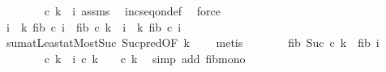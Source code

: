 \begin{isabellebody}
\ \ \ \ \ \ \isamarkupfalse%
\ {\isacartoucheopen}c\ k\ {\isacharless}{\kern0pt}\ i{\isacartoucheclose}\ assms\ \isamarkupfalse%
\ inc{\isacharunderscore}{\kern0pt}seq{\isacharunderscore}{\kern0pt}on{\isacharunderscore}{\kern0pt}def\ \isamarkupfalse%
\ force{\isacharplus}{\kern0pt}\isanewline
\ \ \ \ \isamarkupfalse%
\ {\isachardoublequoteopen}{\isacharparenleft}{\kern0pt}{\isasymSum}i\ {\isacharequal}{\kern0pt}\ {}{\isachardot}{\kern0pt}{\isachardot}{\kern0pt}k{\isacharminus}{\kern0pt}{}{\isachardot}{\kern0pt}\ fib\ {\isacharparenleft}{\kern0pt}c\ i{\isacharparenright}{\kern0pt}{\isacharparenright}{\kern0pt}\ {\isacharplus}{\kern0pt}\ fib\ {\isacharparenleft}{\kern0pt}c\ k{\isacharparenright}{\kern0pt}\ {\isacharequal}{\kern0pt}\ {\isacharparenleft}{\kern0pt}{\isasymSum}i\ {\isacharequal}{\kern0pt}\ {}{\isachardot}{\kern0pt}{\isachardot}{\kern0pt}k{\isachardot}{\kern0pt}\ fib\ {\isacharparenleft}{\kern0pt}c\ i{\isacharparenright}{\kern0pt}{\isacharparenright}{\kern0pt}{\isachardoublequoteclose}\isanewline
\ \ \ \ \ \ \isamarkupfalse%
\ sum{\isachardot}{\kern0pt}atLeast{}{\isacharunderscore}{\kern0pt}atMost{\isacharunderscore}{\kern0pt}Suc\ Suc{\isacharunderscore}{\kern0pt}pred{\isacharprime}{\kern0pt}{\isacharbrackleft}{\kern0pt}OF\ {\isacartoucheopen}k\ {\isachargreater}{\kern0pt}\ {}{\isacartoucheclose}{\isacharbrackright}{\kern0pt}\ \isamarkupfalse%
\ metis\isanewline
\ \ \ \ \isamarkupfalse%
\ \isamarkupfalse%
\ {\isachardoublequoteopen}fib\ {\isacharparenleft}{\kern0pt}Suc\ {\isacharparenleft}{\kern0pt}c\ {\isacharparenleft}{\kern0pt}k{\isacharminus}{\kern0pt}{}{\isacharparenright}{\kern0pt}{\isacharparenright}{\kern0pt}{\isacharparenright}{\kern0pt}\ {\isasymle}\ fib\ {\isacharparenleft}{\kern0pt}i{\isacharminus}{\kern0pt}{}{\isacharparenright}{\kern0pt}{\isachardoublequoteclose}\isanewline
\ \ \ \ \ \ \isamarkupfalse%
\ {\isacartoucheopen}c\ k\ {\isacharless}{\kern0pt}\ i{\isacartoucheclose}\ {\isacartoucheopen}c\ {\isacharparenleft}{\kern0pt}k{\isacharminus}{\kern0pt}{}{\isacharparenright}{\kern0pt}\ {\isacharplus}{\kern0pt}\ {}\ {\isacharless}{\kern0pt}\ c\ k{\isacartoucheclose}\ \isamarkupfalse%
\ {\isacharparenleft}{\kern0pt}simp\ add{\isacharcolon}{\kern0pt}\ fib{\isacharunderscore}{\kern0pt}mono{\isacharparenright}{\kern0pt}\isanewline
\ \ \ \ \isamarkupfalse%

\end{isabellebody}
